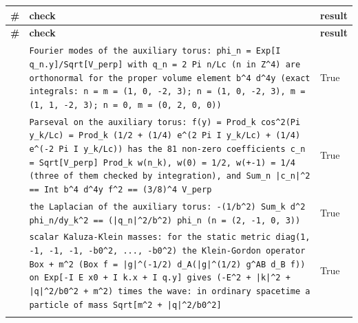 \documentclass[10pt,a4paper]{article}
\begin{document}
{\footnotesize
\begin{longtable}{>{\raggedright\arraybackslash}p{}>{\raggedright\arraybackslash}p{}>{\raggedright\arraybackslash}p{}}
\toprule
\textbf{\#} & \textbf{check} & \textbf{result} \\
\midrule\endfirsthead
\toprule
\textbf{\#} & \textbf{check} & \textbf{result} \\
\midrule\endhead
\endfoot
\bottomrule\endlastfoot
423 & \texttt{Fourier modes of the auxiliary torus: phi\_\allowbreak{}n = Exp[I q\_\allowbreak{}n.y]/\allowbreak{}Sqrt[V\_\allowbreak{}perp] with q\_\allowbreak{}n = 2 Pi n/\allowbreak{}Lc (n in Z\textasciicircum{}4) are orthonormal for the proper volume element b\textasciicircum{}4 d\textasciicircum{}4y (exact integrals: n = m = (1, 0, -2, 3); n = (1, 0, -2, 3), m = (1, 1, -2, 3); n = 0, m = (0, 2, 0, 0))} & True \\
424 & \texttt{Parseval on the auxiliary torus: f(y) = Prod\_\allowbreak{}k cos\textasciicircum{}2(Pi y\_\allowbreak{}k/\allowbreak{}Lc) = Prod\_\allowbreak{}k (1/\allowbreak{}2 + (1/\allowbreak{}4) e\textasciicircum{}(2 Pi I y\_\allowbreak{}k/\allowbreak{}Lc) + (1/\allowbreak{}4) e\textasciicircum{}(-2 Pi I y\_\allowbreak{}k/\allowbreak{}Lc)) has the 81 non-zero coefficients c\_\allowbreak{}n = Sqrt[V\_\allowbreak{}perp] Prod\_\allowbreak{}k w(n\_\allowbreak{}k), w(0) = 1/\allowbreak{}2, w(+-1) = 1/\allowbreak{}4 (three of them checked by integration), and Sum\_\allowbreak{}n |c\_\allowbreak{}n|\textasciicircum{}2 == Int b\textasciicircum{}4 d\textasciicircum{}4y f\textasciicircum{}2 == (3/\allowbreak{}8)\textasciicircum{}4 V\_\allowbreak{}perp} & True \\
425 & \texttt{the Laplacian of the auxiliary torus: -(1/\allowbreak{}b\textasciicircum{}2) Sum\_\allowbreak{}k d\textasciicircum{}2 phi\_\allowbreak{}n/\allowbreak{}dy\_\allowbreak{}k\textasciicircum{}2 == (|q\_\allowbreak{}n|\textasciicircum{}2/\allowbreak{}b\textasciicircum{}2) phi\_\allowbreak{}n (n = (2, -1, 0, 3))} & True \\
426 & \texttt{scalar Kaluza-Klein masses: for the static metric diag(1, -1, -1, -1, -b0\textasciicircum{}2, ..., -b0\textasciicircum{}2) the Klein-Gordon operator Box + m\textasciicircum{}2 (Box f = |g|\textasciicircum{}(-1/\allowbreak{}2) d\_\allowbreak{}A(|g|\textasciicircum{}(1/\allowbreak{}2) g\textasciicircum{}AB d\_\allowbreak{}B f)) on Exp[-I E x0 + I k.x + I q.y] gives (-E\textasciicircum{}2 + |k|\textasciicircum{}2 + |q|\textasciicircum{}2/\allowbreak{}b0\textasciicircum{}2 + m\textasciicircum{}2) times the wave: in ordinary spacetime a particle of mass Sqrt[m\textasciicircum{}2 + |q|\textasciicircum{}2/\allowbreak{}b0\textasciicircum{}2]} & True \\*
\end{longtable}}
\end{document}
